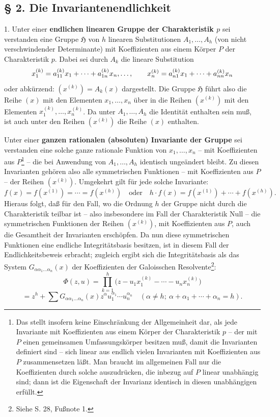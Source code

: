 \subsection*{§ 2. Die Invariantenendlichkeit}

1. Unter einer \textbf{endlichen linearen Gruppe der Charakteristik $p$} sei verstanden eine Gruppe $\mathfrak H$ von $h$ linearen Substitutionen $A_1,\ldots,A_h$ (von nicht verschwindender Determinante) mit Koeffizienten aus einem Körper $P$ der Charakteristik $p$. Dabei sei durch $A_k$ die lineare Substitution
\[
 x_1^{(k)}=a_{11}^{(k)}x_1+\cdots+a_{1n}^{(k)}x_n,\\[-0.2em]
 \ldots,\qquad
 x_n^{(k)}=a_{n1}^{(k)}x_1+\cdots+a_{nn}^{(k)}x_n
\]
oder abkürzend: $(x^{(k)})=A_k(x)$ dargestellt. Die Gruppe $\mathfrak H$ führt also die Reihe $(x)$ mit den Elementen $x_1,\ldots,x_n$ über in die Reihen $(x^{(k)})$ mit den Elementen $x_1^{(k)},\ldots,x_n^{(k)}$. Da unter $A_1,\ldots,A_h$ die Identität enthalten sein muß, ist auch unter den Reihen $(x^{(k)})$ die Reihe $(x)$ enthalten.

Unter einer \textbf{ganzen rationalen (absoluten) Invariante der Gruppe} sei verstanden eine solche ganze rationale Funktion von $x_1,\ldots,x_n$ -- mit Koeffizienten aus $P$\footnote{Das stellt insofern keine Einschränkung der Allgemeinheit dar, als jede Invariante mit Koeffizienten aus einem Körper der Charakteristik $p$ -- der mit $P$ einen gemeinsamen Umfassungskörper besitzen muß, damit die Invarianten definiert sind -- sich linear aus endlich vielen Invarianten mit Koeffizienten aus $P$ zusammensetzen läßt. Man braucht im allgemeinen Fall nur die Koeffizienten durch solche auszudrücken, die inbezug auf $P$ linear unabhängig sind; dann ist die Eigenschaft der Invarianz identisch in diesen unabhängigen erfüllt.} -- die bei Anwendung von $A_1,\ldots,A_h$ identisch ungeändert bleibt. Zu diesen Invarianten gehören also alle symmetrischen Funktionen -- mit Koeffizienten aus $P$ -- der Reihen $(x^{(k)})$. Umgekehrt gilt für jede solche Invariante:
\[
 f(x)=f(x^{(1)})=\cdots=f(x^{(h)})
 \quad\text{oder}\quad
 h\cdot f(x)=f(x^{(1)})+\cdots+f(x^{(h)}).
\]
Hieraus folgt, daß für den Fall, wo die Ordnung $h$ der Gruppe nicht durch die Charakteristik teilbar ist -- also insbesondere im Fall der Charakteristik Null -- die symmetrischen Funktionen der Reihen $(x^{(k)})$, mit Koeffizienten aus $P$, auch die Gesamtheit der Invarianten erschöpfen. Da nun diese symmetrischen Funktionen eine endliche Integritätsbasis besitzen, ist in diesem Fall der Endlichkeitsbeweis erbracht; zugleich ergibt sich die Integritätsbasis als das System $G_{\alpha\alpha_1\ldots\alpha_n}(x)$ der Koeffizienten der Galoisschen Resolvente\footnote{Siehe S. 28, Fußnote 1.}:
\[
 \Phi(z,u)=\prod_{k=1}^{h}\bigl(z-u_1x_1^{(k)}-\cdots-u_nx_n^{(k)}\bigr)
\]
\[
 =z^h+\sum G_{\alpha\alpha_1\ldots\alpha_n}(x)
 z^{\alpha}u_1^{\alpha_1}\cdots u_n^{\alpha_n}
 \quad(\alpha\ne h;\ \alpha+\alpha_1+\cdots+\alpha_n=h).
\]


